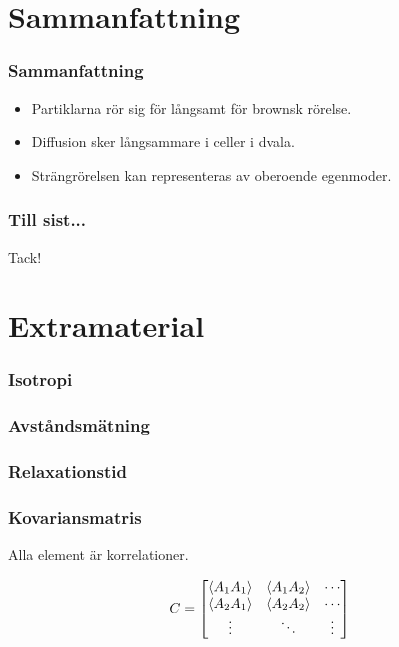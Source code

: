 \documentclass[swedish]{beamer}
\begin{document}
\section{Sammanfattning}
\begin{frame}
\frametitle{Sammanfattning}

\begin{itemize}[label={$\bullet$}]
    
 \item{Partiklarna rör sig för långsamt för brownsk rörelse.}
\\[8mm]
 \item{Diffusion sker långsammare i celler i dvala.}
\\[8mm]
 \item{Strängrörelsen kan representeras av oberoende egenmoder.}

\end{itemize}

\end{frame}


\begin{frame}
\frametitle{Till sist...}
    \begin{center}
    \huge Tack! 
    \end{center}
\end{frame}

\section{Extramaterial}
\begin{frame}
\frametitle{Isotropi}
\begin{figure}
\resizebox{1\textwidth}{!}{  }
\end{figure}
\end{frame}

\begin{frame}
\frametitle{Avståndsmätning}

\begin{figure}
\resizebox{1\textwidth}{!}{  }
\end{figure}

\end{frame}


\begin{frame}
\frametitle{Relaxationstid}

\begin{figure}
\resizebox{.8\textwidth}{!}{  }
\end{figure}

\end{frame}

\begin{frame}
\frametitle{Kovariansmatris}
Alla element är korrelationer. 

\[
C = 
\begin{bmatrix}
\ev{A_1 A_1} & \ev{A_1 A_2} & \cdots \\
\ev{A_2 A_1} & \ev{A_2 A_2} & \cdots \\
\vdots & \ddots & \vdots
\end{bmatrix}
\]

\end{frame}
\end{document}
